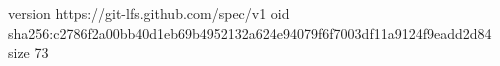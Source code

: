 version https://git-lfs.github.com/spec/v1
oid sha256:c2786f2a00bb40d1eb69b4952132a624e94079f6f7003df11a9124f9eadd2d84
size 73
